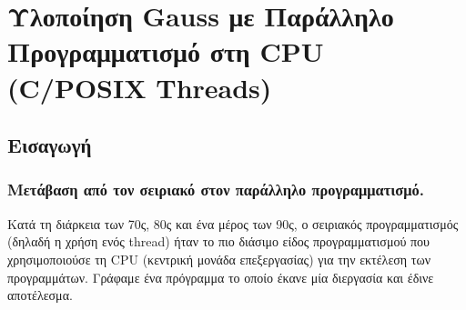 \section{Υλοποίηση {\lt Gauss} με Παράλληλο Προγραμματισμό στη {\lt CPU (C/POSIX Threads)}}

\subsection{Εισαγωγή}



\subsubsection{Μετάβαση από τον σειριακό στον παράλληλο προγραμματισμό.}
    
\noindent
Κατά τη διάρκεια των 70ς, 80ς και ένα μέρος των 90ς, ο σειριακός προγραμματισμός (δηλαδή η χρήση ενός {\lt thread}) ήταν το πιο διάσιμο είδος προγραμματισμού που χρησιμοποιούσε τη {\lt CPU} (κεντρική μονάδα επεξεργασίας) για την εκτέλεση των προγραμμάτων. Γράφαμε ένα πρόγραμμα το οποίο έκανε μία διεργασία και έδινε αποτέλεσμα.
